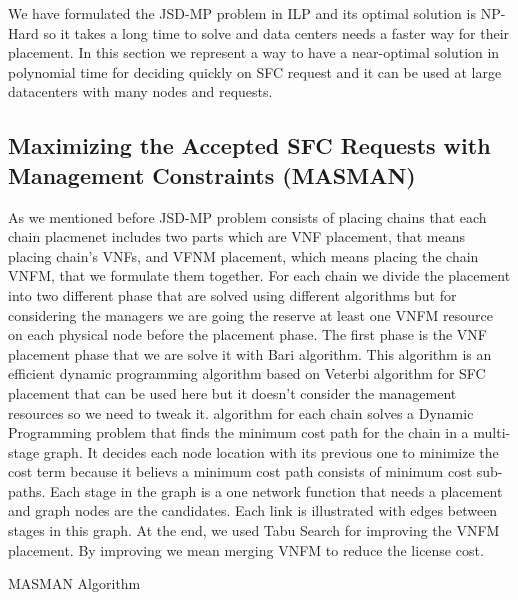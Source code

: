 We have formulated the JSD-MP problem in ILP and its optimal solution is NP-Hard so it takes a long time to solve and data centers needs a faster way for their placement.
In this section we represent a way to have a near-optimal solution in polynomial time for deciding quickly on SFC request and it can be used at large datacenters with many nodes and requests.

\subsection{Maximizing the Accepted SFC Requests with Management Constraints (MASMAN)}
As we mentioned before JSD-MP problem consists of placing chains that each chain placmenet includes two parts which are VNF placement, that means placing chain's VNFs, and VFNM placement, which means placing the chain VNFM, that we formulate them together.
For each chain we divide the placement into two different phase that are solved using different algorithms but for considering the managers we are going the reserve at least one VNFM resource on each physical node before the placement phase.
The first phase is the VNF placement phase that we are solve it with Bari \cite{Bari2015} algorithm.
This algorithm is an efficient dynamic programming algorithm based on Veterbi algorithm for SFC placement that can be used here but it doesn't consider the management resources so we need to tweak it.
\cite{Bari2015} algorithm for each chain solves a Dynamic Programming problem that finds the minimum cost path for the chain in a multi-stage graph.
It decides each node location with its previous one to minimize the cost term because it believs a minimum cost path consists of minimum cost sub-paths.
Each stage in the graph is a one network function that needs a placement and graph nodes are the candidates. Each link is illustrated with edges between stages in this graph.
At the end, we used Tabu Search for improving the VNFM placement. By improving we mean merging VNFM to reduce the license cost.

\begin{algorithm}
  \caption{MASMAN Algorithm}
  \label{alg:masman}
  \begin{algorithmic}[1]
      \EndFor
    \EndFor
    \EndFunction
  \end{algorithmic}
\end{algorithm}

